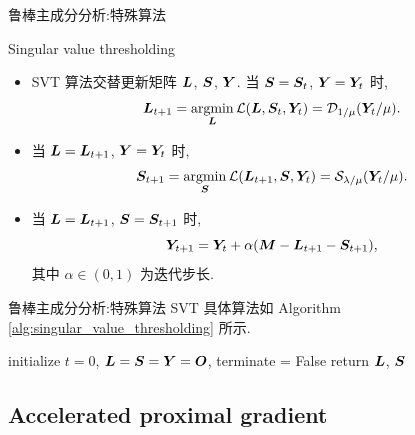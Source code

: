\documentclass{beamer}
\begin{document}
\begin{frame}{鲁棒主成分分析:特殊算法}
  \begin{block}{Singular value thresholding}
    \begin{itemize}
      \item SVT 算法交替更新矩阵 $\bm{L}$, $\bm{S}$, $\bm{Y}$.
      当 $\bm{S}=\bm{S}_{t}$, $\bm{Y}=\bm{Y}_t$ 时,
      \begin{equation}
        \bm{L}_{t+1}
        =\operatorname*{argmin}_{\bm{L}}\mathcal{L}(\bm{L},\bm{S}_t,\bm{Y}_t)
        =\mathcal{D}_{1/\mu}(\bm{Y}_t/\mu).
      \end{equation}
      \item 当 $\bm{L}=\bm{L}_{t+1}$, $\bm{Y}=\bm{Y}_t$ 时,
      \begin{equation}
        \bm{S}_{t+1}
        =\operatorname*{argmin}_{\bm{S}}\mathcal{L}(\bm{L}_{t+1},\bm{S},\bm{Y}_t)
        =\mathcal{S}_{\lambda/\mu}(\bm{Y}_t/\mu).
      \end{equation}
      \item 当 $\bm{L}=\bm{L}_{t+1}$, $\bm{S}=\bm{S}_{t+1}$ 时,
      \begin{equation}
        \bm{Y}_{t+1}
        =\bm{Y}_t+\alpha(\bm{M}-\bm{L}_{t+1}-\bm{S}_{t+1}),
      \end{equation}
      其中 $\alpha\in(0,1)$ 为迭代步长.
    \end{itemize}
  \end{block}
\end{frame}

\begin{frame}{鲁棒主成分分析:特殊算法}
  SVT 具体算法如 Algorithm \ref{alg:singular_value_thresholding} 所示.

  \begin{algorithm}[H]
    \small
    \label{alg:singular_value_thresholding}
    \caption{Singular value thresholding for RPCA.}
    initialize $t=0$, $\bm{L}=\bm{S}=\bm{Y}=\bm{O}$, terminate = False\;
    return $\bm{L}$, $\bm{S}$\;
  \end{algorithm}
\end{frame}

\subsection{Accelerated proximal gradient}
\end{document}

